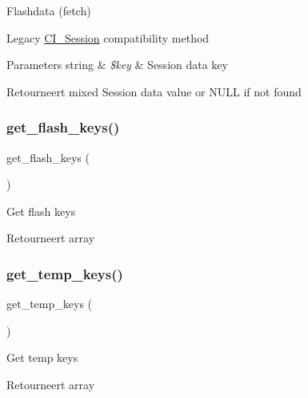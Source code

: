 Flashdata (fetch)

Legacy \mbox{\hyperlink{class_c_i___session}{C\+I\+\_\+\+Session}} compatibility method


\begin{DoxyParams}[1]{Parameters}
string & {\em \$key} & Session data key \\
\hline
\end{DoxyParams}
\begin{DoxyReturn}{Retourneert}
mixed Session data value or N\+U\+LL if not found 
\end{DoxyReturn}
\mbox{\label{class_c_i___session_a996e70387750cdc480712c1585743d8d}} 
\subsubsection{\texorpdfstring{get\_flash\_keys()}{get\_flash\_keys()}}
{\footnotesize\ttfamily get\+\_\+flash\+\_\+keys (\begin{DoxyParamCaption}{ }\end{DoxyParamCaption})}

Get flash keys

\begin{DoxyReturn}{Retourneert}
array 
\end{DoxyReturn}
\mbox{\label{class_c_i___session_a4fd9f48ff9bcf093778529cb7389eddb}} 
\subsubsection{\texorpdfstring{get\_temp\_keys()}{get\_temp\_keys()}}
{\footnotesize\ttfamily get\+\_\+temp\+\_\+keys (\begin{DoxyParamCaption}{ }\end{DoxyParamCaption})}

Get temp keys

\begin{DoxyReturn}{Retourneert}
array 
\end{DoxyReturn}
\mbox{\label{class_c_i___session_a85456fcd9f556e20767051fc33762607}} 
